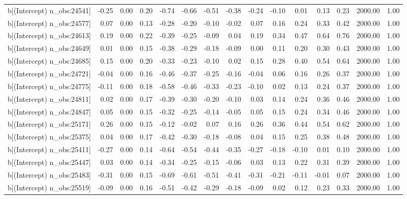 \begin{table}[ht]
\begin{tabular}{rrrrrrrrrrrrrrr}
  b[(Intercept) n\_obs:24541] & -0.25 & 0.00 & 0.20 & -0.74 & -0.66 & -0.51 & -0.38 & -0.24 & -0.10 & 0.01 & 0.13 & 0.23 & 2000.00 & 1.00 \\ 
  b[(Intercept) n\_obs:24577] & 0.07 & 0.00 & 0.13 & -0.28 & -0.20 & -0.10 & -0.02 & 0.07 & 0.16 & 0.24 & 0.33 & 0.42 & 2000.00 & 1.00 \\ 
  b[(Intercept) n\_obs:24613] & 0.19 & 0.00 & 0.22 & -0.39 & -0.25 & -0.09 & 0.04 & 0.19 & 0.34 & 0.47 & 0.64 & 0.76 & 2000.00 & 1.00 \\ 
  b[(Intercept) n\_obs:24649] & 0.01 & 0.00 & 0.15 & -0.38 & -0.29 & -0.18 & -0.09 & 0.00 & 0.11 & 0.20 & 0.30 & 0.43 & 2000.00 & 1.00 \\ 
  b[(Intercept) n\_obs:24685] & 0.15 & 0.00 & 0.20 & -0.33 & -0.23 & -0.10 & 0.02 & 0.15 & 0.28 & 0.40 & 0.54 & 0.64 & 2000.00 & 1.00 \\ 
  b[(Intercept) n\_obs:24721] & -0.04 & 0.00 & 0.16 & -0.46 & -0.37 & -0.25 & -0.16 & -0.04 & 0.06 & 0.16 & 0.26 & 0.37 & 2000.00 & 1.00 \\ 
  b[(Intercept) n\_obs:24775] & -0.11 & 0.00 & 0.18 & -0.58 & -0.46 & -0.33 & -0.23 & -0.10 & 0.02 & 0.13 & 0.24 & 0.37 & 2000.00 & 1.00 \\ 
  b[(Intercept) n\_obs:24811] & 0.02 & 0.00 & 0.17 & -0.39 & -0.30 & -0.20 & -0.10 & 0.03 & 0.14 & 0.24 & 0.36 & 0.46 & 2000.00 & 1.00 \\ 
  b[(Intercept) n\_obs:24847] & 0.05 & 0.00 & 0.15 & -0.32 & -0.25 & -0.14 & -0.05 & 0.05 & 0.15 & 0.24 & 0.34 & 0.46 & 2000.00 & 1.00 \\ 
  b[(Intercept) n\_obs:25171] & 0.26 & 0.00 & 0.15 & -0.12 & -0.02 & 0.07 & 0.16 & 0.26 & 0.36 & 0.44 & 0.54 & 0.62 & 2000.00 & 1.00 \\ 
  b[(Intercept) n\_obs:25375] & 0.04 & 0.00 & 0.17 & -0.42 & -0.30 & -0.18 & -0.08 & 0.04 & 0.15 & 0.25 & 0.38 & 0.48 & 2000.00 & 1.00 \\ 
  b[(Intercept) n\_obs:25411] & -0.27 & 0.00 & 0.14 & -0.64 & -0.54 & -0.44 & -0.35 & -0.27 & -0.18 & -0.10 & 0.01 & 0.10 & 2000.00 & 1.00 \\ 
  b[(Intercept) n\_obs:25447] & 0.03 & 0.00 & 0.14 & -0.34 & -0.25 & -0.15 & -0.06 & 0.03 & 0.13 & 0.22 & 0.31 & 0.39 & 2000.00 & 1.00 \\ 
  b[(Intercept) n\_obs:25483] & -0.31 & 0.00 & 0.15 & -0.69 & -0.61 & -0.51 & -0.41 & -0.31 & -0.21 & -0.11 & -0.01 & 0.07 & 2000.00 & 1.00 \\ 
  b[(Intercept) n\_obs:25519] & -0.09 & 0.00 & 0.16 & -0.51 & -0.42 & -0.29 & -0.18 & -0.09 & 0.02 & 0.12 & 0.23 & 0.33 & 2000.00 & 1.00 \\ 

\end{tabular}
\end{table}
